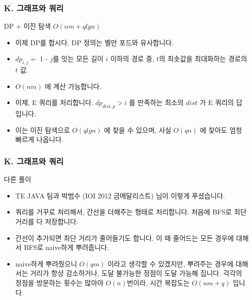 \documentclass{beamer}
\begin{document}
\begin{frame}
	\frametitle{K. 그래프와 쿼리}
	\begin{block}{DP + 이진 탐색 $O(nm + qlgn)$}
		\begin{itemize}
			\item 이제 DP를 합시다. DP 정의는 벨만 포드와 유사합니다.
			\item $dp_{i, j} = $ 1 - $j$를 잇는 모든 길이 $i$ 이하의 경로 중, $t$의 최솟값을 최대화하는 경로의 $t$ 값.
			\item $O(nm)$ 에 계산 가능합니다.
			\item 이제, E 쿼리를 처리합니다. $dp_{dist, p} > i$ 를 만족하는 최소의 $dist$ 가 E 쿼리의 답입니다.
			\item 이는 이진 탐색으로 $O(qlgn)$ 에 찾을 수 있으며, 사실 $O(qn)$ 에 찾아도 엄청 빠르게 나옵니다.
		\end{itemize}
	\end{block}
\end{frame}
\begin{frame}
	\frametitle{K. 그래프와 쿼리}
	\begin{block}{다른 풀이}
		\begin{itemize}
			\item TE JAVA 팀과 박범수 (IOI 2012 금메달리스트) 님이 이렇게 푸셨습니다.
			\item 쿼리를 거꾸로 처리해서, 간선을 더해주는 형태로 처리합니다. 처음에 BFS로 최단 거리를 다 저장합니다.
			\item 간선이 추가되면 최단 거리가 줄어들기도 합니다. 이 때 줄어드는 모든 경우에 대해서 BFS로 naive하게 뿌려줍니다.
			\item naive하게 뿌려줬으니 $O(qm)$ 이라고 생각할 수 있겠지만, 뿌려주는 경우에 대해서는 거리가 항상 감소하거나, 도달 불가능한 정점이 도달 가능해 집니다. 각각의 정점을 방문하는 횟수는 많아야 $O(n)$번이라, 시간 복잡도는 $O(nm + q)$ 입니다. 
		\end{itemize}
	\end{block}
\end{frame}
\end{document}
